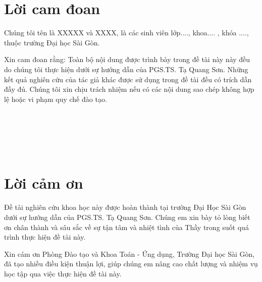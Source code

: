\documentclass[12pt,a4paper]{report}
\begin{document}
	\renewcommand{\baselinestretch}{1.2}
	\fontsize{13pt}{20pt}\selectfont
	
	\chapter*{Lời cam đoan}
	\thispagestyle{fancy}
	\vspace{1cm}
	\indent
	
	Chúng tôi tên là XXXXX và XXXX, là các  sinh viên lớp...., khoa.... , khóa ....,  thuộc trường Đại học Sài Gòn. 
	
	Xin cam đoan rằng: Toàn bộ nội dung được trình bày trong đề tài  này này đều do chúng tôi thực hiện dưới sự hướng dẫn của PGS.TS. Tạ Quang Sơn.
	Những kết quả nghiên cứu của tác giả khác được sử dụng trong đề tài  đều có trích dẫn đầy đủ. 
	Chúng tôi xin chịu trách nhiệm nếu có các nội dung sao chép không hợp lệ hoặc vi phạm quy chế đào tạo. 
	\\
	\\
	\\
	\\
	\\
	\\
	
	
	\chapter*{Lời cảm ơn}
	\thispagestyle{fancy}
	\vspace{1cm}
	\indent
	
	Đề tài nghiên cứu khoa học này được hoàn thành tại trường Đại Học Sài Gòn dưới sự hướng dẫn của PGS.TS. Tạ Quang Sơn.   Chúng em xin bày tỏ lòng biết ơn chân thành và sâu sắc về sự tận tâm và nhiệt tình của Thầy trong suốt quá trình thực hiện đề tài này.
	
	
	\bigskip
	Xin cám ơn Phòng Đào tạo  và Khoa Toán - Ứng dụng, Trường Đại học Sài Gòn, đã tạo nhiều điều kiện thuận lợi, giúp chúng em nâng cao chất lượng và nhiệm vụ học tập qua việc thực hiện đề tài này.
	\\
	\\
	\\
	\\
	\\
	
\end{document}
